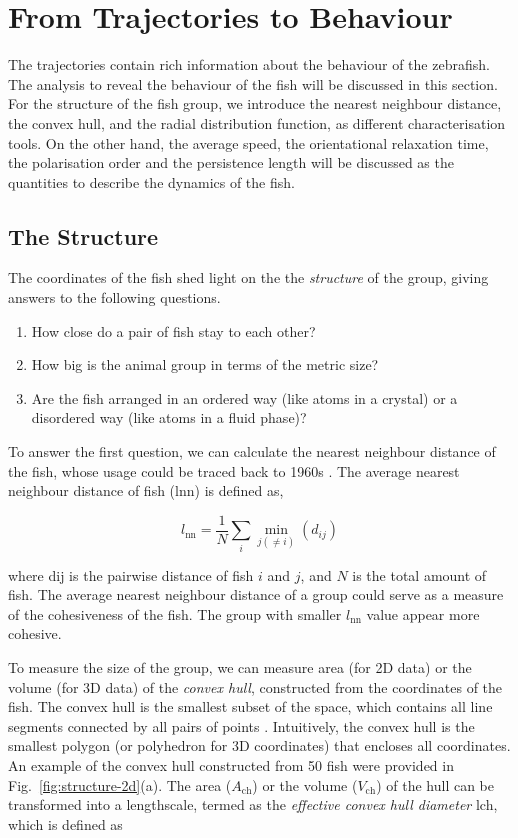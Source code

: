 \documentclass[11pt,twoside]{report}
\begin{document}
\section{From Trajectories to Behaviour}
\label{section:trajectory-analysis}

The trajectories contain rich information about the behaviour of the zebrafish.
The analysis to reveal the behaviour of the fish will be discussed in this section.
For the structure of the fish group, we introduce the nearest neighbour distance, the convex hull, and the radial distribution function, as different characterisation tools. On the other hand, the average speed, the orientational relaxation time, the polarisation order and the persistence length will be discussed as the quantities to describe the dynamics of the fish.


\subsection{The Structure}

The coordinates of the fish shed light on the the \emph{structure} of the group, giving answers to the following questions.

\begin{enumerate}
	\item How close do a pair of fish stay to each other?
	\item How big is the animal group in terms of the metric size?
	\item Are the fish arranged in an ordered way (like atoms in a crystal) or a disordered way (like atoms in a fluid phase)?
\end{enumerate}

To answer the first question, we can calculate the nearest neighbour distance of the fish, whose usage could be traced back to 1960s \cite{cullen1965}. The average nearest neighbour distance of fish (\gls{lnn}) is defined as,

\begin{equation}
	l_\textrm{nn} =\frac{1}{N}\sum_i\min_{j (\neq i)}(d_{ij})
\label{eq:nnd}
\end{equation}

\noindent where \gls{dij} is the pairwise distance of fish $i$ and $j$, and $N$ is the total amount of fish. The average nearest neighbour distance of a group could serve as a measure of the cohesiveness of the fish. The group with smaller $l_\textrm{nn}$ value appear more cohesive.

To measure the size of the group, we can measure area (for 2D data) or the volume (for 3D data) of the \emph{convex hull}, constructed from the coordinates of the fish. The convex hull is the smallest subset of the space, which contains all line segments connected by all pairs of points \cite{berg2000}. Intuitively, the convex hull is the smallest polygon (or polyhedron for 3D coordinates) that encloses all coordinates. An example of the convex hull constructed from 50 fish were provided in Fig.~\ref{fig:structure-2d}(a). The area ($A_\mathrm{ch}$) or the volume ($V_\mathrm{ch}$) of the hull can be transformed into a lengthscale, termed as the \emph{effective convex hull diameter} \gls{lch}, which is defined as
\end{document}
